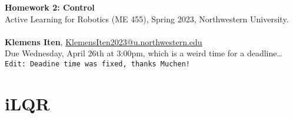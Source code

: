 \documentclass[letterpaper, 12pt]{article}
\begin{document}

\large\textbf{Homework 2: Control} \\  
\normalsize Active Learning for Robotics (ME 455), Spring 2023, Northwestern University.
\\ \\
\normalsize\textbf{Klemens Iten}, \href{mailto:KlemensIten2023@u.northwestern.edu}{KlemensIten2023@u.northwestern.edu}\\
\normalsize   Due Wednesday, April 26th at 3:00pm, which is a weird time for a deadline\ldots
\small \texttt{Edit: Deadine time was fixed, thanks Muchen!}

\section{iLQR}



% 
% 
\end{document}
